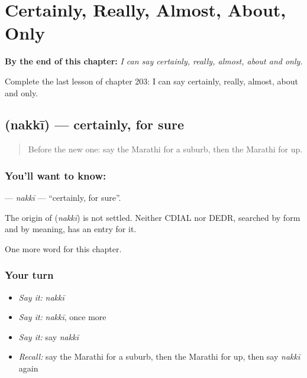 
\chapter{Certainly, Really, Almost, About, Only}
\label{ch:mr-certainly-really-almost-about-only}

\begin{chapteropening}
\textbf{By the end of this chapter:} \emph{I can say certainly, really, almost, about and only.}

Complete the last lesson of chapter 203: I can say certainly, really, almost, about and only.
\end{chapteropening}

\section[\texorpdfstring{\mr{नक्की} (nakkī)}{नक्की (nakkī)}]{ (nakkī) — certainly, for sure}

\label{lesson:MR-C203-nakki}



\begin{quote}
Before the new one: say the Marathi for a suburb, then the Marathi for up.
\end{quote}

\subsection*{You'll want to know: }
\textbf{} — \emph{nakkī} — \textquotedblleft{}certainly, for sure\textquotedblright{}.

\begin{cousinweb}
The origin of \textbf{} (\emph{nakkī}) is not settled. Neither CDIAL nor DEDR, searched by form and by meaning, has an entry for it.
\end{cousinweb}

\begin{grammarlens}[title={What you've built}]
One more word for this chapter.
\end{grammarlens}

\subsection*{Your turn}
\begin{itemize}
\raggedright
  \item \emph{Say it:} \emph{nakkī}
  \item \emph{Say it:} \emph{nakkī}, once more
  \item \emph{Say it:} say \emph{nakkī}
  \item \emph{Recall:} say the Marathi for a suburb, then the Marathi for up, then say \emph{nakkī} again
\end{itemize}

